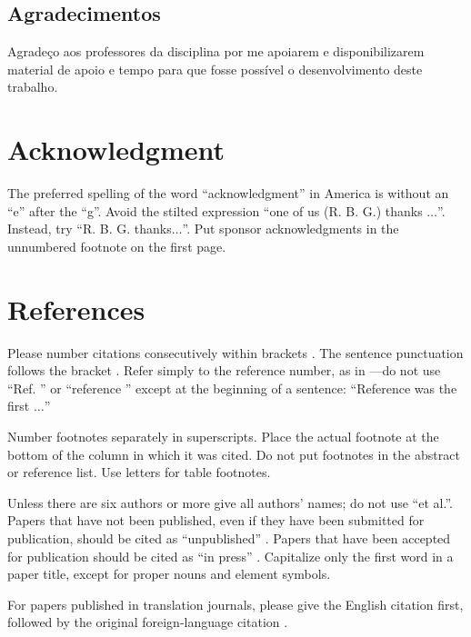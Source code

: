 \documentclass[conference]{IEEEtran}
\begin{document}
\subsection{Agradecimentos}
Agradeço aos professores da disciplina por me apoiarem e disponibilizarem material de apoio e tempo para que fosse possível o desenvolvimento deste trabalho.




\section*{Acknowledgment}

The preferred spelling of the word ``acknowledgment'' in America is without 
an ``e'' after the ``g''. Avoid the stilted expression ``one of us (R. B. 
G.) thanks $\ldots$''. Instead, try ``R. B. G. thanks$\ldots$''. Put sponsor 
acknowledgments in the unnumbered footnote on the first page.

\section*{References}

Please number citations consecutively within brackets \cite{b1}. The 
sentence punctuation follows the bracket \cite{b2}. Refer simply to the reference 
number, as in \cite{b3}---do not use ``Ref. \cite{b3}'' or ``reference \cite{b3}'' except at 
the beginning of a sentence: ``Reference \cite{b3} was the first $\ldots$''

Number footnotes separately in superscripts. Place the actual footnote at 
the bottom of the column in which it was cited. Do not put footnotes in the 
abstract or reference list. Use letters for table footnotes.

Unless there are six authors or more give all authors' names; do not use 
``et al.''. Papers that have not been published, even if they have been 
submitted for publication, should be cited as ``unpublished'' \cite{b4}. Papers 
that have been accepted for publication should be cited as ``in press'' \cite{b5}. 
Capitalize only the first word in a paper title, except for proper nouns and 
element symbols.

For papers published in translation journals, please give the English 
citation first, followed by the original foreign-language citation \cite{b6}.
\end{document}
